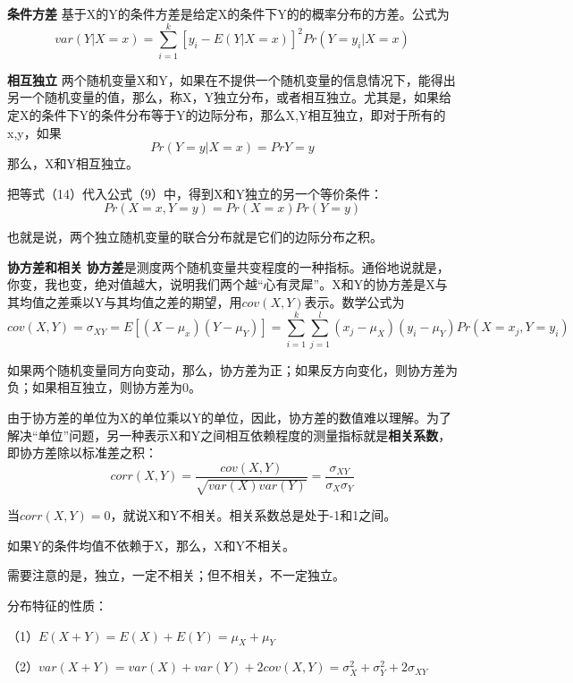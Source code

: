 \documentclass[cn,12pt,math=newtx,citestyle=gb7714-2015,bibstyle=gb7714-2015]{elegantbook}
\begin{document}
	\textbf{条件方差}
	基于X的Y的条件方差是给定X的条件下Y的的概率分布的方差。公式为
	\begin{equation}
		var(Y|X=x)=\sum_{i=1}^{k}{[y_i-E(Y|X=x)]^2Pr(Y=y_i|X=x)}
	\end{equation}
	
	\textbf{相互独立}
	两个随机变量X和Y，如果在不提供一个随机变量的信息情况下，能得出另一个随机变量的值，那么，称X，Y独立分布，或者相互独立。尤其是，如果给定X的条件下Y的条件分布等于Y的边际分布，那么X,Y相互独立，即对于所有的x,y，如果
	\begin{equation}
		Pr(Y=y|X=x)=Pr{Y=y}
	\end{equation}
	那么，X和Y相互独立。
	
	把等式（14）代入公式（9）中，得到X和Y独立的另一个等价条件：\begin{equation}
		Pr(X=x,Y=y)=Pr(X=x)Pr(Y=y)
	\end{equation}
	
	也就是说，两个独立随机变量的联合分布就是它们的边际分布之积。
	
	\textbf{协方差和相关}
	\textbf{协方差}是测度两个随机变量共变程度的一种指标。通俗地说就是，你变，我也变，绝对值越大，说明我们两个越“心有灵犀”。X和Y的协方差是X与其均值之差乘以Y与其均值之差的期望，用$cov(X,Y)$表示。数学公式为
	\begin{equation}
		cov(X,Y)=\sigma_{XY}=E[(X-\mu_x)(Y-\mu_Y)]=\sum_{i=1}^{k}{\sum_{j=1}^{l}{(x_j-\mu_X)(y_i-\mu_Y)Pr(X=x_j,Y=y_i)}}
	\end{equation}
	
	如果两个随机变量同方向变动，那么，协方差为正；如果反方向变化，则协方差为负；如果相互独立，则协方差为0。
	
	由于协方差的单位为X的单位乘以Y的单位，因此，协方差的数值难以理解。为了解决“单位”问题，另一种表示X和Y之间相互依赖程度的测量指标就是\textbf{相关系数}，即协方差除以标准差之积：
	\begin{equation}
		corr(X,Y)=\frac{cov(X,Y)}{\sqrt{var(X)var(Y)}}=\frac{\sigma_{XY}}{\sigma_X\sigma_Y}
	\end{equation}
	
	当$corr(X,Y)=0$，就说X和Y不相关。相关系数总是处于-1和1之间。
	
	如果Y的条件均值不依赖于X，那么，X和Y不相关。
	
	需要注意的是，独立，一定不相关；但不相关，不一定独立。
	
	分布特征的性质：
	
	（1）$E(X+Y)=E(X)+E(Y)=\mu_X+\mu_Y$
	
	（2）$var(X+Y)=var(X)+var(Y)+2cov(X,Y)=\sigma_{X}^2+\sigma_{Y}^2+2\sigma_{XY}$
	
\end{document}
